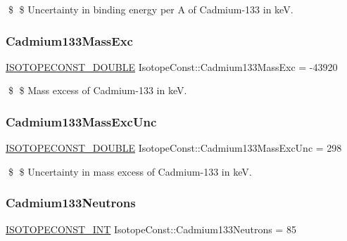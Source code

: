 \$ \$ Uncertainty in binding energy per A of Cadmium-\/133 in keV. \mbox{\label{group___isotope_const-_cadmium-_cd133_ga064bf6843131110ea6416f03f7fa89a3}} 
\subsubsection{\texorpdfstring{Cadmium133\+Mass\+Exc}{Cadmium133MassExc}}
{\footnotesize\ttfamily \mbox{\hyperlink{group___isotope_const-_macros_ga8f45a7272ce02c0b4c65c44636ed719a}{I\+S\+O\+T\+O\+P\+E\+C\+O\+N\+S\+T\+\_\+\+D\+O\+U\+B\+LE}} Isotope\+Const\+::\+Cadmium133\+Mass\+Exc = -\/43920}

\$ \$ Mass excess of Cadmium-\/133 in keV. \mbox{\label{group___isotope_const-_cadmium-_cd133_gae3e4f3c066408fc65d4a31197b5d7591}} 
\subsubsection{\texorpdfstring{Cadmium133\+Mass\+Exc\+Unc}{Cadmium133MassExcUnc}}
{\footnotesize\ttfamily \mbox{\hyperlink{group___isotope_const-_macros_ga8f45a7272ce02c0b4c65c44636ed719a}{I\+S\+O\+T\+O\+P\+E\+C\+O\+N\+S\+T\+\_\+\+D\+O\+U\+B\+LE}} Isotope\+Const\+::\+Cadmium133\+Mass\+Exc\+Unc = 298}

\$ \$ Uncertainty in mass excess of Cadmium-\/133 in keV. \mbox{\label{group___isotope_const-_cadmium-_cd133_gad84911ee7277231e879e55fe45e34c93}} 
\subsubsection{\texorpdfstring{Cadmium133\+Neutrons}{Cadmium133Neutrons}}
{\footnotesize\ttfamily \mbox{\hyperlink{group___isotope_const-_macros_ga5f18360b3e99483a35c32d789e62621c}{I\+S\+O\+T\+O\+P\+E\+C\+O\+N\+S\+T\+\_\+\+I\+NT}} Isotope\+Const\+::\+Cadmium133\+Neutrons = 85}


